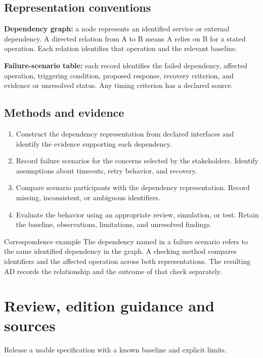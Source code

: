 \documentclass[11pt,letterpaper]{article}
\newcommand{\TemplatePageBreak}{\clearpage}
\newcommand{\Lead}[1]{\textcolor{Muted}{#1}\par\vspace{3pt}}
\begin{document}
\subsection{Representation conventions}
\textbf{Dependency graph:} a node represents an identified service or external
dependency. A directed relation from A to B means A relies on B for a stated
operation. Each relation identifies that operation and the relevant baseline.

\textbf{Failure-scenario table:} each record identifies the failed dependency,
affected operation, triggering condition, proposed response, recovery criterion,
and evidence or unresolved status. Any timing criterion has a declared source.

\subsection{Methods and evidence}
\begin{enumerate}
\item Construct the dependency representation from declared interfaces and
identify the evidence supporting each dependency.
\item Record failure scenarios for the concerns selected by the stakeholders.
Identify assumptions about timeouts, retry behavior, and recovery.
\item Compare scenario participants with the dependency representation.
Record missing, inconsistent, or ambiguous identifiers.
\item Evaluate the behavior using an appropriate review, simulation, or test.
Retain the baseline, observations, limitations, and unresolved findings.
\end{enumerate}

\begin{TemplateNote}{Correspondence example}
\small
The dependency named in a failure scenario refers to the same identified
dependency in the graph. A checking method compares identifiers and the
affected operation across both representations. The resulting AD records the
relationship and the outcome of that check separately.
\end{TemplateNote}

\TemplatePageBreak
\section{Review, edition guidance and sources}
\Lead{Release a usable specification with a known baseline and explicit limits.}
\end{document}
